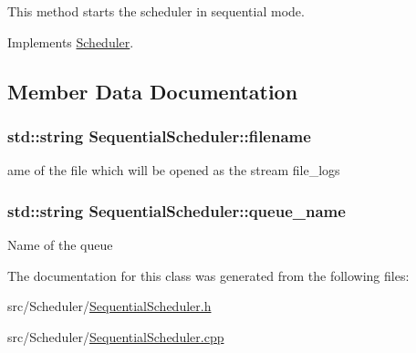 This method starts the scheduler in sequential mode. 



Implements \hyperlink{classScheduler_aaa8fed2f8fab3a5c0e5d1d462915e415}{Scheduler}.



\subsection{Member Data Documentation}
\hypertarget{classSequentialScheduler_a86b32eaf91dbc706879c43194142d554}{
\subsubsection[{filename}]{\setlength{\rightskip}{0pt plus 5cm}std\-::string Sequential\-Scheduler\-::filename\hspace{0.3cm}{\ttfamily [private]}}}\label{classSequentialScheduler_a86b32eaf91dbc706879c43194142d554}
ame of the file which will be opened as the stream file\-\_\-logs \hypertarget{classSequentialScheduler_a2bb2fec195ae97c733509221cf6f293f}{
\subsubsection[{queue\-\_\-name}]{\setlength{\rightskip}{0pt plus 5cm}std\-::string Sequential\-Scheduler\-::queue\-\_\-name\hspace{0.3cm}{\ttfamily [private]}}}\label{classSequentialScheduler_a2bb2fec195ae97c733509221cf6f293f}
Name of the queue 

The documentation for this class was generated from the following files\-:\begin{DoxyCompactItemize}
\item 
src/\-Scheduler/\hyperlink{SequentialScheduler_8h}{Sequential\-Scheduler.\-h}\item 
src/\-Scheduler/\hyperlink{SequentialScheduler_8cpp}{Sequential\-Scheduler.\-cpp}\end{DoxyCompactItemize}

